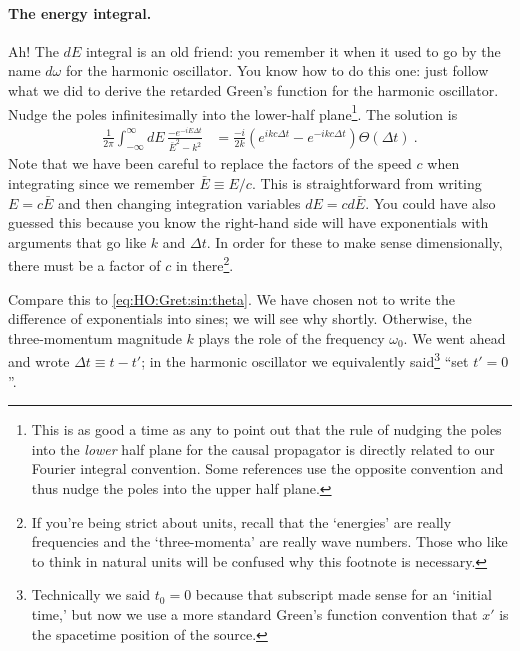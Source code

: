 \paragraph{The energy integral.} Ah! The $dE$ integral is an old friend: you remember it when it used to go by the name $d\omega$ for the harmonic oscillator. You know how to do this one: just follow what we did to derive the retarded Green's function for the harmonic oscillator. Nudge the poles infinitesimally into the lower-half plane\footnote{This is as good a time as any to point out that the rule of nudging the poles into the \emph{lower} half plane for the causal propagator is directly related to our Fourier integral convention. Some references use the opposite convention and thus nudge the poles into the upper half plane.}. The solution is
\begin{align}
   \frac{1}{2\pi}\int_{-\infty}^\infty dE \, 
  \frac{-e^{-iE \Delta t}}{\bar{E}^2-k^2}
  &= \frac{-i}{2k}\left(e^{ikc\Delta t} - e^{-ikc\Delta t}\right)\Theta(\Delta t) \ .
\end{align}
Note that we have been careful to replace the factors of the speed $c$ when integrating since we remember $\bar E \equiv E/c$. This is straightforward from writing $E = c\bar E$ and then changing integration variables $dE = cd\bar{E}$. You could have also guessed this because you know the right-hand side will have exponentials with arguments that go like $k$ and $\Delta t$. In order for these to make sense dimensionally, there must be a factor of $c$ in there\footnote{If you're being strict about units, recall that the `energies' are really frequencies and the `three-momenta' are really wave numbers. Those who like to think in natural units will be confused why this footnote is necessary.}.

Compare this to \eqref{eq:HO:Gret:sin:theta}. We have chosen not to write the difference of exponentials into sines; we will see why shortly. Otherwise, the three-momentum magnitude $k$ plays the role of the frequency $\omega_0$. We went ahead and wrote $\Delta t \equiv t-t'$; in the harmonic oscillator we equivalently said\footnote{Technically we said $t_0=0$ because that subscript made sense for an `initial time,' but now we use a more standard Green's function convention that $x'$ is the spacetime position of the source.} ``set $t'=0$''. 

